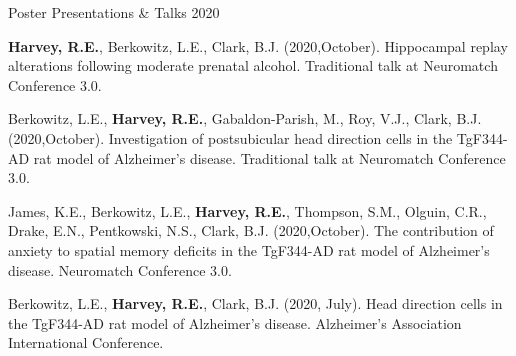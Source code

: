 

\begin{cventries}
\cventry
    {Poster Presentations \& Talks} %
    {} %
    {} %
    {2020} %
    {
      \begin{cvitems} %
        \setlength\itemsep{0.35em}
        \item {\textbf{Harvey, R.E.}, Berkowitz, L.E., Clark, B.J. (2020,October). Hippocampal replay alterations following moderate prenatal alcohol. Traditional talk at Neuromatch Conference 3.0.}
        \item {Berkowitz, L.E., \textbf{Harvey, R.E.}, Gabaldon-Parish, M., Roy, V.J., Clark, B.J. (2020,October). Investigation of postsubicular head direction cells in the TgF344-AD rat model of Alzheimer’s disease. Traditional talk at Neuromatch Conference 3.0.}
        \item {James, K.E., Berkowitz, L.E., \textbf{Harvey, R.E.}, Thompson, S.M., Olguin, C.R., Drake, E.N., Pentkowski, N.S., Clark, B.J. (2020,October). The contribution of anxiety to spatial memory deficits in the TgF344-AD rat model of Alzheimer’s disease. Neuromatch Conference 3.0.}
        \item {Berkowitz, L.E., \textbf{Harvey, R.E.}, Clark, B.J. (2020, July). Head direction cells in the TgF344-AD rat model of Alzheimer's disease. Alzheimer's Association International Conference.}      
      \end{cvitems}
    }
\end{cventries}
    
